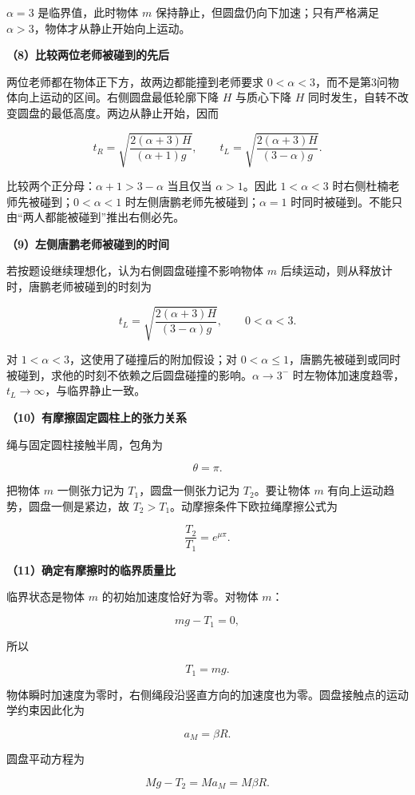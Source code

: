 \documentclass[12pt,a4paper,UTF8]{ctexart}
\begin{document}
\(\alpha=3\) 是临界值，此时物体 \(m\)
保持静止，但圆盘仍向下加速；只有严格满足
\(\alpha>3\)，物体才从静止开始向上运动。

\textbf{（8）比较两位老师被碰到的先后}

两位老师都在物体正下方，故两边都能撞到老师要求
\(0<\alpha<3\)，而不是第3问物体向上运动的区间。右侧圆盘最低轮廓下降
\(H\) 与质心下降 \(H\)
同时发生，自转不改变圆盘的最低高度。两边从静止开始，因而

\[t_R=\sqrt{\frac{2(\alpha+3)H}{(\alpha+1)g}},\qquad t_L=\sqrt{\frac{2(\alpha+3)H}{(3-\alpha)g}}.\]

比较两个正分母：\(\alpha+1>3-\alpha\) 当且仅当 \(\alpha>1\)。因此
\(1<\alpha<3\) 时右侧杜楠老师先被碰到；\(0<\alpha<1\)
时左侧唐鹏老师先被碰到；\(\alpha=1\)
时同时被碰到。不能只由``两人都能被碰到''推出右侧必先。

\textbf{（9）左侧唐鹏老师被碰到的时间}

若按题设继续理想化，认为右側圆盘碰撞不影响物体 \(m\)
后续运动，则从释放计时，唐鹏老师被碰到的时刻为

\[\boxed{t_L=\sqrt{\frac{2(\alpha+3)H}{(3-\alpha)g}}},\qquad0<\alpha<3.\]

对 \(1<\alpha<3\)，这使用了碰撞后的附加假设；对
\(0<\alpha\le1\)，唐鹏先被碰到或同时被碰到，求他的时刻不依赖之后圆盘碰撞的影响。\(\alpha\to3^-\)
时左物体加速度趋零，\(t_L\to\infty\)，与临界静止一致。

\textbf{（10）有摩擦固定圆柱上的张力关系}

绳与固定圆柱接触半周，包角为

\[
\theta=\pi.
\tag{23}
\]

把物体 \(m\) 一侧张力记为 \(T_1\)，圆盘一侧张力记为 \(T_2\)。要让物体
\(m\) 有向上运动趋势，圆盘一侧是紧边，故
\(T_2>T_1\)。动摩擦条件下欧拉绳摩擦公式为

\[
\boxed{\frac{T_2}{T_1}=e^{\mu\pi}}.
\tag{24}
\]

\textbf{（11）确定有摩擦时的临界质量比}

临界状态是物体 \(m\) 的初始加速度恰好为零。对物体 \(m\)：

\[
mg-T_1=0,
\]

所以

\[
\boxed{T_1=mg}.
\tag{25}
\]

物体瞬时加速度为零时，右侧绳段沿竖直方向的加速度也为零。圆盘接触点的运动学约束因此化为

\[
a_M=\beta R.
\tag{26}
\]

圆盘平动方程为

\[
Mg-T_2=Ma_M=M\beta R.
\tag{27}
\]
\end{document}
